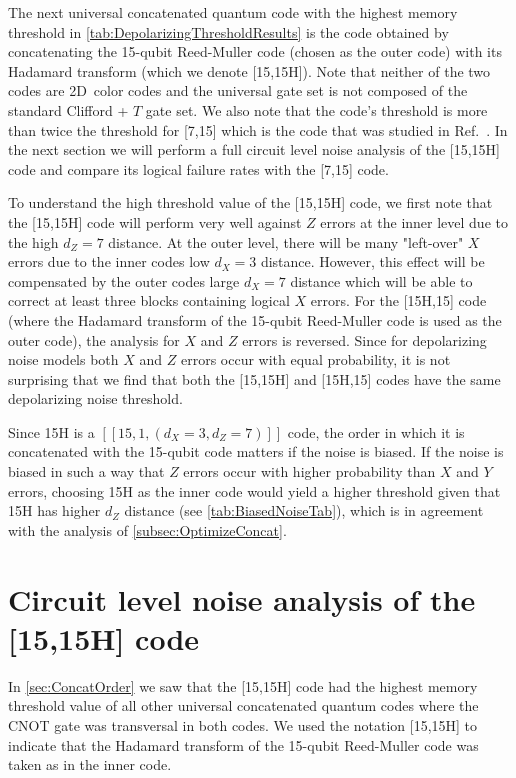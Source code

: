 \documentclass[pra,longbibliography,twocolumn,showpacs,nofootinbib,superscriptaddress,notitlepage]{revtex4-1}
\newcommand{\codepar}[1]{\ensuremath{[\![#1]\!]}}
\begin{document}
The next universal concatenated quantum code with the highest memory threshold in \cref{tab:DepolarizingThresholdResults} is the code obtained by concatenating the 15-qubit Reed-Muller code (chosen as the outer code) with its Hadamard transform (which we denote [15,15H]). Note that neither of the two codes are 2D~color codes and the universal gate set is not composed of the standard Clifford + $T$ gate set. We also note that the code's threshold is more than twice the threshold for [7,15] which is the code that was studied in Ref.~\cite{CJL16}. In the next section we will perform a full circuit level noise analysis of the [15,15H] code and compare its logical failure rates with the [7,15] code. 

To understand the high threshold value of the [15,15H] code, we first note that the [15,15H] code will perform very well against $Z$ errors at the inner level due to the high $d_{Z}=7$ distance. At the outer level, there will be many "left-over" $X$ errors due to the inner codes low $d_{X}=3$ distance. However, this effect will be compensated by the outer codes large $d_{X}=7$ distance which will be able to correct at least three blocks containing logical $X$ errors. For the [15H,15] code (where the Hadamard transform of the 15-qubit Reed-Muller code is used as the outer code), the analysis for $X$ and $Z$ errors is reversed. Since for depolarizing noise models both $X$ and $Z$ errors occur with equal probability, it is not surprising that we find that both the [15,15H] and [15H,15] codes have the same depolarizing noise threshold.

Since 15H is a $\codepar{15,1,(d_{X}=3,d_{Z}=7)}$ code, the order in which it is concatenated with the 15-qubit code matters if the noise is biased. If the noise is biased in such a way that $Z$ errors occur with higher probability than $X$ and $Y$ errors, choosing 15H as the inner code would yield a higher threshold given that 15H has higher $d_{Z}$ distance (see \cref{tab:BiasedNoiseTab}), which is in agreement with the analysis of \cref{subsec:OptimizeConcat}. 


\section{Circuit level noise analysis of the [15,15H] code}
\label{sec:Circuit15Noise}

In \cref{sec:ConcatOrder} we saw that the [15,15H] code had the highest memory threshold value of all other universal concatenated quantum codes where the CNOT gate was transversal in both codes. We used the notation [15,15H] to indicate that the Hadamard transform of the 15-qubit Reed-Muller code was taken as in the inner code. 
\end{document}

